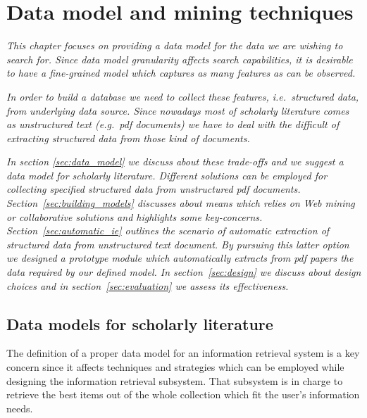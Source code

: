 \chapter{\label{chap:data_model}Data model and mining techniques}
\textit{This chapter focuses on providing a data model for the data we are wishing to search for. Since data model granularity affects search capabilities, it is desirable to have a fine-grained model which captures as many features as can be observed.}

\textit{In order to build a database we need to collect these features, i.e.\ structured data, from underlying data source. Since nowadays most of scholarly literature comes as unstructured text (e.g.\ pdf documents) we have to deal with the difficult of extracting structured data from those kind of documents.}

\textit{In section \ref{sec:data_model} we discuss about these trade-offs and we suggest a data model for scholarly literature. Different solutions can be employed for collecting specified structured data from unstructured pdf documents. Section~\ref{sec:building_models} discusses about means which relies on Web mining or collaborative solutions and highlights some key-concerns. Section~\ref{sec:automatic_ie} outlines the scenario of automatic extraction of structured data from unstructured text document. By pursuing this latter option we designed a prototype module which automatically extracts from pdf papers the data required by our defined model. In section~\ref{sec:design} we discuss about design choices and in section~\ref{sec:evaluation} we assess its effectiveness.}


\section{\label{sec:data_model}Data models for scholarly literature}
The definition of a proper data model for an information retrieval system is a key concern since it affects techniques and strategies which can be employed while designing the information retrieval subsystem. That subsystem is in charge to retrieve the best items out of the whole collection which fit the user's information needs.

